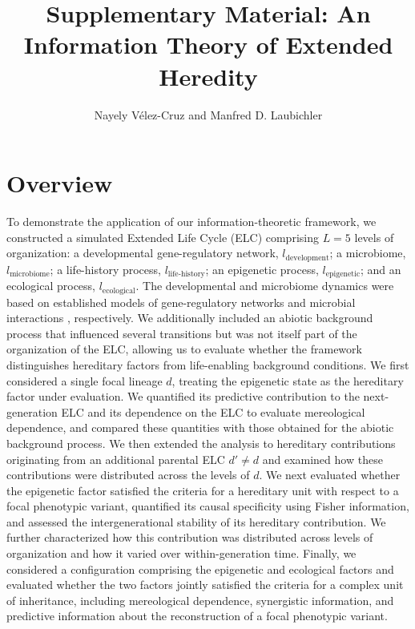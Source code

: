 \documentclass[11pt]{article}
\title{Supplementary Material: An Information Theory of Extended Heredity}
\author{Nayely V\'{e}lez-Cruz and Manfred D. Laubichler}
\date{}
\begin{document}
\maketitle

\section{Overview}
To demonstrate the application of our information-theoretic framework, we constructed a simulated Extended Life Cycle (ELC) comprising $L=5$ levels of organization: a developmental gene-regulatory network, $l_{\mathrm{development}}$; a microbiome, $l_{\mathrm{microbiome}}$; a life-history process, $l_{\mathrm{life\text{-}history}}$; an epigenetic process, $l_{\mathrm{epigenetic}}$; and an ecological process, $l_{\mathrm{ecological}}$. The developmental and microbiome dynamics were based on established models of gene-regulatory networks \cite{dejong2002modeling} and microbial interactions \cite{stein2013ecological,bucci2016mdsine}, respectively. We additionally included an abiotic background process that influenced several transitions but was not itself part of the organization of the ELC, allowing us to evaluate whether the framework distinguishes hereditary factors from life-enabling background conditions. We first considered a single focal lineage $d$, treating the epigenetic state as the hereditary factor under evaluation. We quantified its predictive contribution to the next-generation ELC and its dependence on the ELC to evaluate mereological dependence, and compared these quantities with those obtained for the abiotic background process. We then extended the analysis to hereditary contributions originating from an additional parental ELC $d' \neq d$ and examined how these contributions were distributed across the levels of $d$. We next evaluated whether the epigenetic factor satisfied the criteria for a hereditary unit with respect to a focal phenotypic variant, quantified its causal specificity using Fisher information, and assessed the intergenerational stability of its hereditary contribution. We further characterized how this contribution was distributed across levels of organization and how it varied over within-generation time. Finally, we considered a configuration comprising the epigenetic and ecological factors and evaluated whether the two factors jointly satisfied the criteria for a complex unit of inheritance, including mereological dependence, synergistic information, and predictive information about the reconstruction of a focal phenotypic variant.
\end{document}
